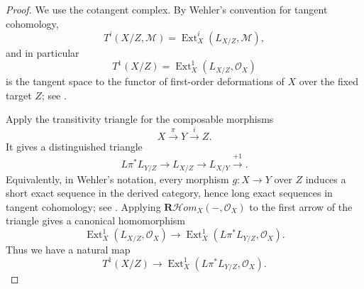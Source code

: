 \documentclass[11pt,twoside]{amsart}
\theoremstyle{plain}
\numberwithin{equation}{section}
\theoremstyle{definition}
\begin{document}
\begin{proof}
We use the cotangent complex. By Wehler's convention for tangent cohomology,
\[
    T^i(X/Z,\mathcal M)
    =
    \operatorname{Ext}^i_X(L_{X/Z},\mathcal M),
\]
and in particular
\[
    T^1(X/Z)=\operatorname{Ext}^1_X(L_{X/Z},\mathcal O_X)
\]
is the tangent space to the functor of first-order deformations of \(X\) over the
fixed target \(Z\); see \cite[\S 1.1--1.2]{Wehler1986}.

Apply the transitivity triangle for the composable morphisms
\[
    X \xrightarrow{\pi} Y \xrightarrow{i} Z.
\]
It gives a distinguished triangle
\[
    L\pi^*L_{Y/Z}
    \longrightarrow
    L_{X/Z}
    \longrightarrow
    L_{X/Y}
    \xrightarrow{+1}.
\]
Equivalently, in Wehler's notation, every morphism \(g:X\to Y\) over \(Z\)
induces a short exact sequence in the derived category, hence long exact
sequences in tangent cohomology; see \cite[\S 1.3(e)]{Wehler1986}. Applying
\(\mathbf R\mathcal Hom_X(-,\mathcal O_X)\) to the first arrow of the triangle gives
a canonical homomorphism
\[
    \operatorname{Ext}^1_X(L_{X/Z},\mathcal O_X)
    \longrightarrow
    \operatorname{Ext}^1_X(L\pi^*L_{Y/Z},\mathcal O_X).
\]
Thus we have a natural map
\[
    T^1(X/Z)
    \longrightarrow
    \operatorname{Ext}^1_X(L\pi^*L_{Y/Z},\mathcal O_X).
\]


\end{proof}
\end{document}

